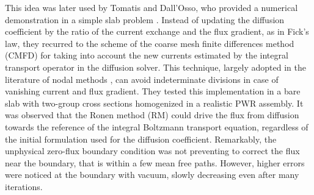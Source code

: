 \documentclass{ictt26}
\begin{document}
This idea was later used by Tomatis and Dall'Osso, who provided a numerical demonstration in a simple slab problem \cite{tomatis2011application}. Instead of updating the diffusion coefficient by the ratio of the current exchange and the flux gradient, as in Fick's law, they recurred to the scheme of the coarse mesh finite differences method (CMFD) for taking into account the new currents estimated by the integral transport operator in the diffusion solver.
%
%
This technique, largely adopted in the literature of nodal methods \cite{smith1983nodal,lawrence1986progress}, can avoid indeterminate divisions in case of vanishing current and flux gradient. They tested this implementation in a bare slab with two-group cross sections homogenized in a realistic PWR assembly. It was observed that the Ronen method (RM) could drive the flux from diffusion towards the reference of the integral Boltzmann transport equation, regardless of the initial formulation used for the diffusion coefficient. Remarkably, the unphysical zero-flux boundary condition was not preventing to correct the flux near the boundary, that is within a few mean free paths. However, higher errors were noticed at the boundary with vacuum, slowly decreasing even after many iterations.%
%
%
\end{document}
